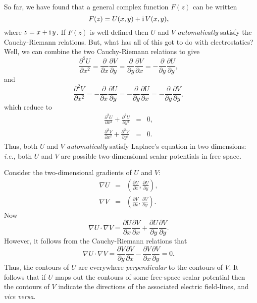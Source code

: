 So far, we have found that a general complex function $F(z)$ can be written
\begin{equation}
F(z) = U(x, y)+{\rm i}\,V(x, y),
\end{equation}
where $z= x + {\rm i}\,y$.  If $F(z)$ is well-defined then $U$ and $V$ {\em
automatically} satisfy the Cauchy-Riemann relations.
But, what has all of this got to do with electrostatics? Well, we can combine the
two Cauchy-Riemann relations to give
\begin{equation}
\frac{\partial^2 U}{\partial x^2} = \frac{\partial}{\partial x}
\frac{\partial V}{\partial y}= \frac{\partial}{\partial y}
 \frac{\partial V}{\partial x}= - \frac{\partial}{\partial y} \frac{\partial U}
{\partial y},
\end{equation}
and
\begin{equation}
\frac{\partial^2 V}{\partial x^2} = -\frac{\partial}{\partial x}
\frac{\partial U}{\partial y}= -\frac{\partial}{\partial y}
 \frac{\partial U}{\partial x}= - \frac{\partial}{\partial y} \frac{\partial V}
{\partial y},
\end{equation}
which reduce to
\begin{eqnarray}
\frac{\partial^2 U}{\partial x^2} + \frac{\partial^2 U}{\partial y^2} &=& 0,
\\[0.5ex]
\frac{\partial^2 V}{\partial x^2} + \frac{\partial^2 V}{\partial y^2} &=& 0.
\end{eqnarray}
Thus, both $U$ and $V$ {\em automatically} satisfy Laplace's equation in
two dimensions: {\em i.e.}, both $U$ and $V$ are possible two-dimensional scalar potentials
in free space. 

Consider the two-dimensional gradients of $U$ and $V$:
\begin{eqnarray}
\nabla U &=& \left( \frac{\partial U}{\partial x}, \frac{\partial U}{\partial y}
\right),\\[0.5ex]
\nabla V &=& \left( \frac{\partial V}{\partial x}, \frac{\partial V}{\partial y}
\right).
\end{eqnarray}
Now
\begin{equation}
\nabla U \cdot \nabla V = \frac{\partial U}{\partial x}\frac{\partial V}{\partial x}
+\frac{\partial U}{\partial y} \frac{\partial V}{\partial y}.
\end{equation}
However, it follows from the Cauchy-Riemann relations that
\begin{equation}
\nabla U \cdot \nabla V = \frac{\partial V}{\partial y}\frac{\partial V}{\partial x}
-\frac{\partial V}{\partial x} \frac{\partial V}{\partial y}=0.
\end{equation}
Thus, the contours of $U$ are everywhere {\em perpendicular} to the contours of $V$. 
It follows that if $U$ maps out the contours of some free-space scalar potential
then the contours of $V$ indicate the directions of the associated electric field-lines,
and {\em vice versa}.


